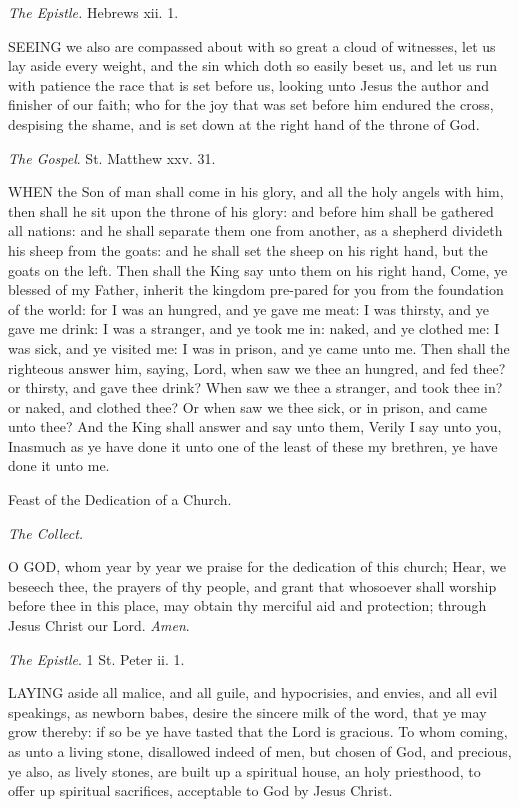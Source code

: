 \emph{The Epistle.} Hebrews xii. 1.

SEEING
we also are compassed about with so great a cloud of witnesses, let us
lay aside every weight, and the sin which doth so easily beset us, and
let us run with patience the race that is set before us, looking unto
Jesus the author and finisher of our faith; who for the joy that was set
before him endured the cross, despising the shame, and is set down at
the right hand of the throne of God.

\emph{The Gospel}. St. Matthew xxv. 31.

WHEN
the Son of man shall come in his glory, and all the holy angels with him,
then shall he sit upon the throne of his glory: and before him shall be
gathered all nations: and he shall separate them one from another, as
a shepherd divideth his sheep from the goats: and he shall set the sheep
on his right hand, but the goats on the left. Then shall the King say
unto them on his right hand, Come, ye blessed of my Father, inherit the
kingdom pre-pared for you from the foundation of the world: for I was
an hungred, and ye gave me meat: I was thirsty, and ye gave me drink:
I was a stranger, and ye took me in: naked, and ye clothed me: I was sick,
and ye visited me: I was in prison, and ye came unto me. Then shall the
righteous answer him, saying, Lord, when saw we thee an hungred, and fed
thee? or thirsty, and gave thee drink? When saw we thee a stranger, and
took thee in? or naked, and clothed thee? Or when saw we thee sick, or
in prison, and came unto thee? And the King shall answer and say unto
them, Verily I say unto you, Inasmuch as ye have done it unto one of the
least of these my brethren, ye have done it unto me.

Feast
of the Dedication of a Church.

\emph{The
Collect.}

O
GOD, whom year by year we praise for the dedication of this church; Hear,
we beseech thee, the prayers of thy people, and grant that whosoever shall
worship before thee in this place, may obtain thy merciful aid and protection;
through Jesus Christ our Lord. \emph{Amen}.

\emph{The Epistle}. 1 St. Peter ii. 1.

LAYING
aside all malice, and all guile, and hypocrisies, and envies, and all
evil speakings, as newborn babes, desire the sincere milk of the word,
that ye may grow thereby: if so be ye have tasted that the Lord is gracious.
To whom coming, as unto a living stone, disallowed indeed of men, but
chosen of God, and precious, ye also, as lively stones, are built up a
spiritual house, an holy priesthood, to offer up spiritual sacrifices,
acceptable to God by Jesus Christ.


